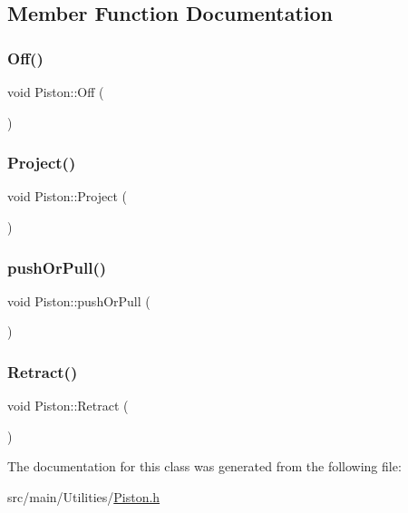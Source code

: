 \subsection{Member Function Documentation}
\mbox{\label{classPiston_a44a19e212f16a4793b125d2725c470ce}} 
\subsubsection{\texorpdfstring{Off()}{Off()}}
{\footnotesize\ttfamily void Piston\+::\+Off (\begin{DoxyParamCaption}{ }\end{DoxyParamCaption})\hspace{0.3cm}{\ttfamily [inline]}}

\mbox{\label{classPiston_ad02eef5cfb0ed9f92ee4605dadb46440}} 
\subsubsection{\texorpdfstring{Project()}{Project()}}
{\footnotesize\ttfamily void Piston\+::\+Project (\begin{DoxyParamCaption}{ }\end{DoxyParamCaption})\hspace{0.3cm}{\ttfamily [inline]}}

\mbox{\label{classPiston_ad41333bdc156996df7552b766073be3d}} 
\subsubsection{\texorpdfstring{push\+Or\+Pull()}{pushOrPull()}}
{\footnotesize\ttfamily void Piston\+::push\+Or\+Pull (\begin{DoxyParamCaption}{ }\end{DoxyParamCaption})\hspace{0.3cm}{\ttfamily [inline]}}

\mbox{\label{classPiston_a37038045cb847723f935f625f4ff6d84}} 
\subsubsection{\texorpdfstring{Retract()}{Retract()}}
{\footnotesize\ttfamily void Piston\+::\+Retract (\begin{DoxyParamCaption}{ }\end{DoxyParamCaption})\hspace{0.3cm}{\ttfamily [inline]}}



The documentation for this class was generated from the following file\+:\begin{DoxyCompactItemize}
\item 
src/main/\+Utilities/\hyperlink{Piston_8h}{Piston.\+h}\end{DoxyCompactItemize}
